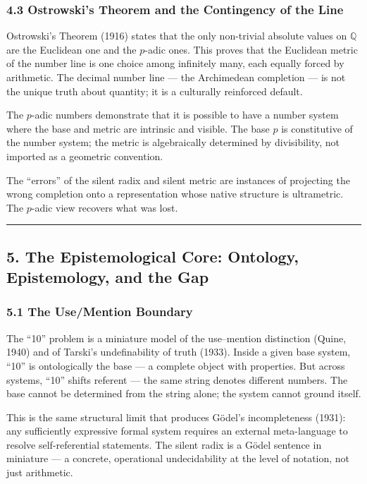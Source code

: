 \documentclass[
]{article}
\begin{document}
\subsubsection{4.3 Ostrowski's Theorem and the Contingency of the
Line}\label{ostrowskis-theorem-and-the-contingency-of-the-line}

Ostrowski's Theorem (1916) states that the only non-trivial absolute
values on \(\mathbb{Q}\) are the Euclidean one and the \(p\)-adic ones.
This proves that the Euclidean metric of the number line is one choice
among infinitely many, each equally forced by arithmetic. The decimal
number line --- the Archimedean completion --- is not the unique truth
about quantity; it is a culturally reinforced default.

The \(p\)-adic numbers demonstrate that it is possible to have a number
system where the base and metric are intrinsic and visible. The base
\(p\) is constitutive of the number system; the metric is algebraically
determined by divisibility, not imported as a geometric convention.

The ``errors'' of the silent radix and silent metric are instances of
projecting the wrong completion onto a representation whose native
structure is ultrametric. The \(p\)-adic view recovers what was lost.

\begin{center}\rule{0.5\linewidth}{0.5pt}\end{center}

\subsection{5. The Epistemological Core: Ontology, Epistemology, and the
Gap}\label{the-epistemological-core-ontology-epistemology-and-the-gap}

\subsubsection{5.1 The Use/Mention
Boundary}\label{the-usemention-boundary}

The ``10'' problem is a miniature model of the use--mention distinction
(Quine, 1940) and of Tarski's undefinability of truth (1933). Inside a
given base system, ``10'' is ontologically the base --- a complete
object with properties. But across systems, ``10'' shifts referent ---
the same string denotes different numbers. The base cannot be determined
from the string alone; the system cannot ground itself.

This is the same structural limit that produces Gödel's incompleteness
(1931): any sufficiently expressive formal system requires an external
meta-language to resolve self-referential statements. The silent radix
is a Gödel sentence in miniature --- a concrete, operational
undecidability at the level of notation, not just arithmetic.
\end{document}
